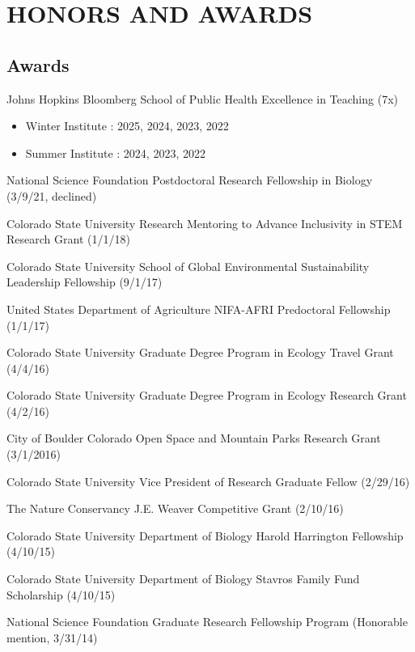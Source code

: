 \documentclass{cv}
\begin{document}
\section*{HONORS AND AWARDS}

\subsection*{Awards}

Johns Hopkins Bloomberg School of Public Health Excellence in Teaching (7x)

\begin{itemize}
\vspace{-0.28cm}
\item Winter Institute : 2025, 2024, 2023, 2022
\vspace{-0.3cm}
\item Summer Institute : 2024, 2023, 2022
\vspace{-0.25cm}
\end{itemize}
	
National Science Foundation Postdoctoral Research Fellowship in Biology (3/9/21, declined) %

Colorado State University Research Mentoring to Advance Inclusivity in STEM Research Grant (1/1/18) %

Colorado State University School of Global Environmental Sustainability Leadership Fellowship (9/1/17) 

United States Department of Agriculture NIFA-AFRI Predoctoral Fellowship (1/1/17) %

Colorado State University Graduate Degree Program in Ecology Travel Grant (4/4/16) %

Colorado State University Graduate Degree Program in Ecology Research Grant (4/2/16) %

City of Boulder Colorado Open Space and Mountain Parks Research Grant (3/1/2016) %

Colorado State University Vice President of Research Graduate Fellow (2/29/16) %

The Nature Conservancy J.E. Weaver Competitive Grant (2/10/16) %

Colorado State University Department of Biology Harold Harrington Fellowship (4/10/15) %

Colorado State University Department of Biology Stavros Family Fund Scholarship (4/10/15) %

National Science Foundation Graduate Research Fellowship Program (Honorable mention, 3/31/14) 
\end{document}
